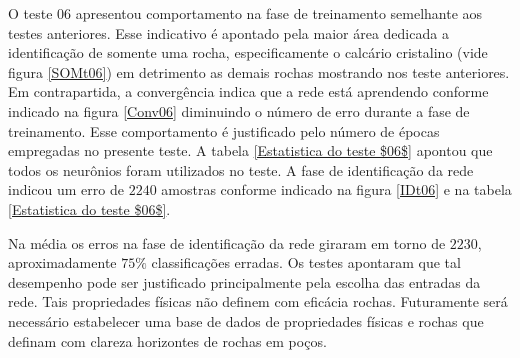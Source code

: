 O teste $06$ apresentou comportamento na fase de treinamento semelhante aos testes anteriores. Esse indicativo é apontado pela maior área dedicada a identificação de somente uma rocha, especificamente o calcário cristalino (vide figura \ref{SOMt06}) em detrimento as demais rochas mostrando nos teste anteriores. Em contrapartida, a convergência indica que a rede está aprendendo conforme indicado na figura \ref{Conv06} diminuindo o número de erro durante a fase de treinamento. Esse comportamento é justificado pelo número de épocas empregadas no presente teste. A tabela \ref{Estatistica do teste $06$} apontou que todos os neurônios foram utilizados no teste. A fase de identificação da rede indicou um erro de $2240$ amostras conforme indicado na figura \ref{IDt06} e na tabela \ref{Estatistica do teste $06$}.

Na média os erros na fase de identificação da rede giraram em torno de $2230$, aproximadamente $75\%$ classificações erradas. Os testes apontaram que tal desempenho pode ser justificado principalmente pela escolha das entradas da rede. Tais propriedades físicas não definem com eficácia rochas. Futuramente será necessário estabelecer uma base de dados de propriedades físicas e rochas que definam com clareza horizontes de rochas em poços.    


 